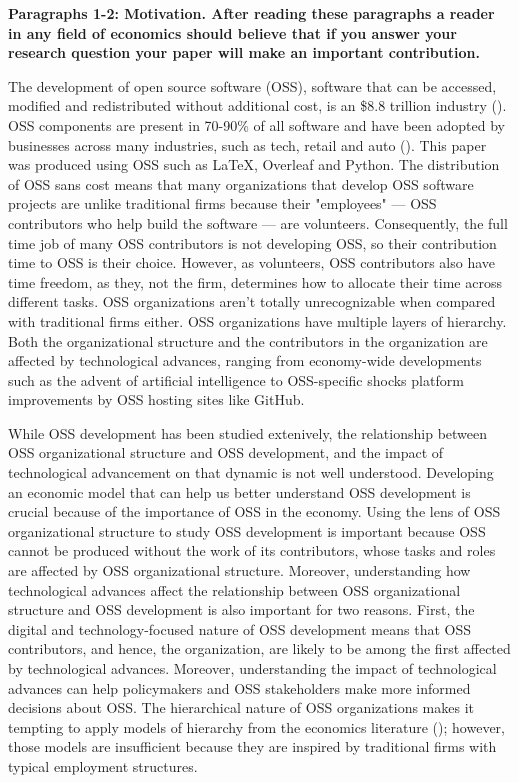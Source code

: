 \documentclass[source/paper/main.tex]{subfiles}
\begin{document}
\textbf{Paragraphs 1-2: Motivation. After reading these paragraphs a reader in any field of economics should believe that if you answer your research question your paper will make an important contribution.}

The development of open source software (OSS), software that can be accessed, modified and redistributed without additional cost, is an \$8.8 trillion industry (\cite{hoffmann_value_2024}). OSS components are present in 70-90\% of all software and have been adopted by businesses across many industries, such as tech, retail and auto (\cite{nagle_open_2017}). This paper was produced using OSS such as LaTeX, Overleaf and Python. The distribution of OSS sans cost means that many organizations that develop OSS software projects are unlike traditional firms because their "employees" --- OSS contributors who help build the software --- are volunteers. Consequently, 
the full time job of many OSS contributors is not developing OSS, so their contribution time to OSS is their choice. However, as volunteers, OSS contributors also have time freedom, as they, not the firm, determines how to allocate their time across different tasks. OSS organizations aren't totally unrecognizable when compared with traditional firms either. OSS organizations have multiple layers of hierarchy. Both the organizational structure and the contributors in the organization are affected by technological advances, ranging from economy-wide developments such as the advent of artificial intelligence to OSS-specific shocks platform improvements by OSS hosting sites like GitHub.

\qquad While OSS development has been studied extenively, the relationship between OSS organizational structure and OSS development, and the impact of technological advancement on that dynamic is not well understood. Developing an economic model that can help us better understand OSS development is crucial because of the importance of OSS in the economy. Using the lens of OSS organizational structure to study OSS development is important because OSS cannot be produced without the work of its contributors, whose tasks and roles are affected by OSS organizational structure. Moreover, understanding how technological advances affect the relationship between OSS organizational structure and OSS development is also important for two reasons. First, the digital and technology-focused nature of OSS development means that OSS contributors, and hence, the organization, are likely to be among the first affected by technological advances. Moreover, understanding the impact of technological advances can help policymakers and OSS stakeholders make more informed decisions about OSS. The hierarchical nature of OSS organizations makes it tempting to apply models of hierarchy from the economics literature (\cite{garicano_hierarchies_2000}); however, those models are insufficient because they are inspired by traditional firms with typical employment structures. 
\end{document}
